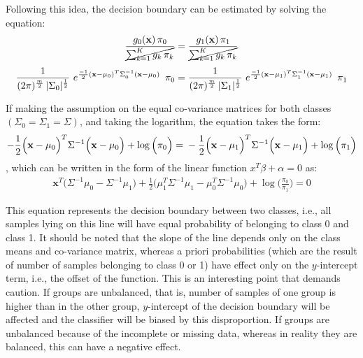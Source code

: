 Following this idea, the decision boundary can be estimated by solving the equation:
\begin{equation} 
\frac{g_0(\mathbf{x}) \, \pi_0} {\cancel{\sum_{k=1}^K{g_k \, \pi_k}}} = \frac{g_1(\mathbf{x}) \, \pi_1} {\cancel{\sum_{k=1}^K{g_k \, \pi_k}}}
\end{equation}
\begin{equation} 
\frac{1}{(2 \pi)^{\nicefrac{m}{2}}\, |\Sigma_0|^{\nicefrac{1}{2}}}\,\, e^{\nicefrac{-1}{2}  (\mathbf{x}-\mu_0)^T  \Sigma_0^{-1} (\mathbf{x}-\mu_0)}  \,\,\,\pi_0 = \\
\frac{1}{(2 \pi)^{\nicefrac{m}{2}}\, |\Sigma_1|^{\nicefrac{1}{2}}}\,\, e^{\nicefrac{-1}{2}  (\mathbf{x}-\mu_1)^T  \Sigma_1^{-1} (\mathbf{x}-\mu_1)}  \,\,\,\pi_1
\end{equation}

If making the assumption on the equal co-variance matrices for both classes $(\Sigma_0 = \Sigma_1  = \Sigma)$, and taking the logarithm, the equation takes the form: 
\begin{equation} 
-\frac{1}{2}  \Big(\mathbf{x}-\mu_0\Big)^T  \Sigma^{-1} \Big(\mathbf{x}-\mu_0\Big) +  \log{\Big(\pi_0\Big)}= \\
-\frac{1}{2}  \Big(\mathbf{x}-\mu_1\Big)^T  \Sigma^{-1} \Big(\mathbf{x}-\mu_1\Big) +  \log{\Big(\pi_1\Big)}
\end{equation}
, which can be written in the form of the linear function $x^T\beta + \alpha = 0$ as:
\begin{equation} 
\begin{split}
\mathbf{x}^T\Big(\Sigma^{-1} \mu_0 - \Sigma^{-1} \mu_1\Big) + \frac{1}{2} \Big(\mu_1^T \Sigma^{-1}\mu_1 - \mu_0^T \Sigma^{-1}\mu_0\Big)
+ \log\Big( \frac{\pi_0}{\pi_1}  \Big) = 0
\end{split}
\end{equation}

This equation represents the decision boundary between two classes, i.e., all samples lying on this line will have equal probability of belonging to class 0 and class 1. It should be noted that the slope of the line depends only on the class means and co-variance matrix, whereas a priori probabilities (which are the result of number of samples belonging to class 0 or 1) have effect only on the $y$-intercept term, i.e., the offset of the function. This is an interesting point that demands caution. If groups are unbalanced, that is, number of samples of one group is higher than in the other group, $y$-intercept of the decision boundary will be affected and the classifier will be biased by this disproportion. If groups are unbalanced because of the incomplete or missing data, whereas in reality they are balanced, this can have a negative effect.

